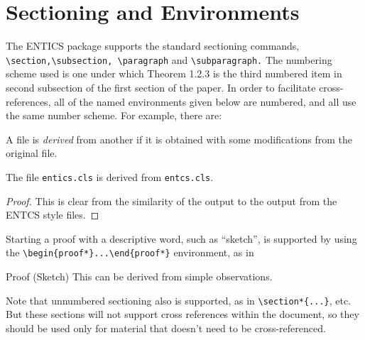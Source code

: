 \documentclass[twoside,11pt]{entics}
\begin{document}
\section{Sectioning and Environments}
The ENTICS package supports the standard sectioning commands,
\verb+\section,\subsection, \paragraph+ and \verb+\subparagraph.+ The numbering
scheme used is one under which Theorem 1.2.3 is the third numbered item in
second subsection of the first section of the paper. In order to facilitate
cross-references, all of the named environments given below are numbered, and
all use the same number scheme. For example, there are:
\begin{definition}
  A file is \emph{derived} from another if it is obtained with some modifications from the original file.
\end{definition}

\begin{theorem}
  The file \texttt{\normalshape entics.cls} is derived from
  \texttt{\normalshape entcs.cls}.
\end{theorem}
\begin{proof}
  This is clear from the similarity of the output to the output from
  the ENTCS style files.
\end{proof}

Starting a proof with a descriptive word, such as ``sketch'', is supported by
using the \verb+\begin{proof*}...\end{proof*}+ environment, as in

\begin{proof*}{Proof (Sketch)}
  This can be derived from simple observations.
\end{proof*}

Note that unnumbered sectioning also is supported, as in \verb+\section*{...}+,
etc. But these sections will not support cross references within the document,
so they should be used only for material that doesn't need to be
cross-referenced.
\end{document}
